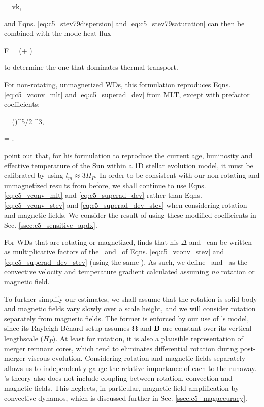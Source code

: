 \eqbegin
\sigma = vk,
\label{eq:c5_stev79saturation}
\eqend

\noindent and Eqns. \ref{eq:c5_stev79dispersion} and \ref{eq:c5_stev79saturation} can then be combined with the mode heat flux

\eqbegin
F = \left(\sigma + \right)
\label{eq:c5_stev79flux}
\eqend

\noindent to determine the one that dominates thermal transport.

For non-rotating, unmagnetized WDs, this formulation reproduces Eqns. \ref{eq:c5_vconv_mlt} and \ref{eq:c5_superad_dev} from MLT, except with prefactor coefficients:

\eqbegin
\Fconv = \left(\right)^{5/2} \vconv^3,
\label{eq:c5_vconv_stev}
\eqend

\eqbegin
\dnabconv = .
\label{eq:c5_superad_dev_stev}
\eqend

\noindent \citeal{stev79} point out that, for his formulation to reproduce the current age, luminosity and effective temperature of the Sun within a 1D stellar evolution model, it must be calibrated by using $l_m \approx 3H_P$.  In order to be consistent with our non-rotating and unmagnetized results from before, we shall continue to use Eqns. \ref{eq:c5_vconv_mlt} and \ref{eq:c5_superad_dev} rather than Eqns. \ref{eq:c5_vconv_stev} and \ref{eq:c5_superad_dev_stev} when considering rotation and magnetic fields.  We consider the result of using these modified coefficients in Sec. \ref{ssec:c5_sensitive_apdx}.


For WDs that are rotating or magnetized, \citeal{stev79} finds that his $\Delta$ and \vconv\ can be written as multiplicative factors of the \dnabconv\ and \vconv\ of Eqns. \ref{eq:c5_vconv_stev} and \ref{eq:c5_superad_dev_stev} (using the same \Fconv).  As such, we define \vconvzero\ and \dnabconvzero\ as the convective velocity and temperature gradient calculated assuming \textit{no} rotation or magnetic field.

To further simplify our estimates, we shall assume that the rotation is solid-body and magnetic fields vary slowly over a scale height, and we will consider rotation separately from magnetic fields.  The former is enforced by our use of \citeal{stev79}'s model, since its Rayleigh-B\'{e}nard setup assumes $\boldsymbol{\Omega}$ and ${\bf B}$ are constant over its vertical lengthscale ($H_P$).  At least for rotation, it is also a plausible representation of merger remnant cores, which tend to eliminates differential rotation during post-merger viscous evolution.  Considering rotation and magnetic fields separately allows us to independently gauge the relative importance of each to the runaway.  \citeal{stev79}'s theory also does not include coupling between rotation, convection and magnetic fields.  This neglects, in particular, magnetic field amplification by convective dynamos, which is discussed further in Sec. \ref{ssec:c5_magaccuracy}.

